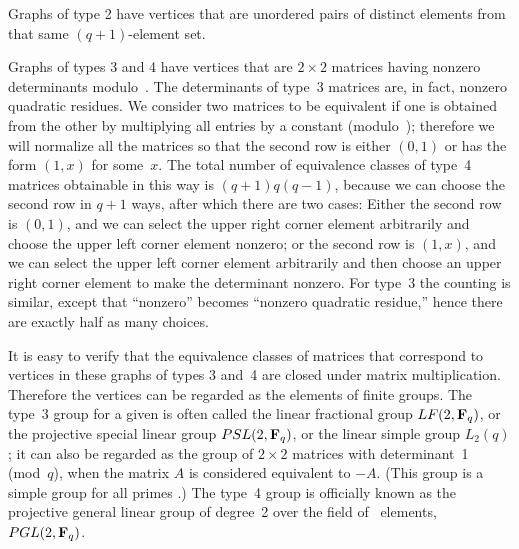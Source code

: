 Graphs of type 2 have vertices that are unordered pairs of
distinct elements from that same $(q+1)$-element set.

Graphs of types 3 and 4 have vertices that are $2\times2$ matrices
having nonzero determinants modulo~. The determinants of type~3
matrices
are, in fact, nonzero quadratic residues. We consider two matrices to be
equivalent if one is obtained from the other by multiplying all entries
by a constant (modulo~); therefore we will normalize all the matrices
so that the second row is either $(0,1)$ or has the form $(1,x)$ for
some~$x$. The total number of equivalence classes of type~4 matrices obtainable
in this way is $(q+1)q(q-1)$, because we can choose the second row in
$q+1$ ways, after which there are two cases: Either the second row is
$(0,1)$, and we can select the upper right corner element arbitrarily
and choose the upper left corner element nonzero; or the second row is $(1,x)$,
and we can select the upper left corner element arbitrarily and then choose
an upper right corner element to make the determinant nonzero. For type~3
the counting is similar, except that ``nonzero'' becomes ``nonzero
quadratic residue,'' hence there are exactly half as many choices.

It is easy to verify that the equivalence classes of matrices that
correspond to vertices in these graphs of types 3 and~4 are closed
under matrix multiplication. Therefore the vertices can be regarded as the
elements of finite groups. The type~3 group for a given  is often
called the linear fractional group $LF(2,{\bf F}_q)$, or the
projective special linear group $PSL(2,{\bf F}_q)$, or the linear
simple group $L_2(q)$; it can also be regarded as the group of
$2\times2$ matrices with determinant~1 (mod~$q$), when the matrix $A$
is considered equivalent to $-A$. (This group is a simple group for
all primes .) The type~4 group is officially known as the
projective general linear group of degree~2 over the field of ~elements,
$PGL(2,{\bf F}_q)$.

